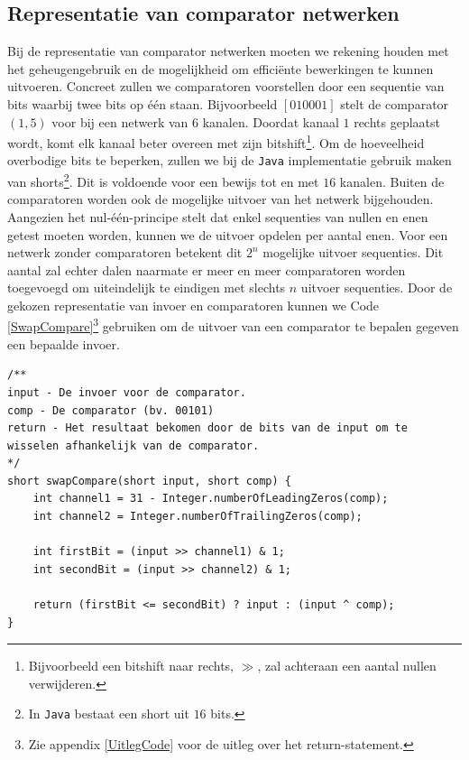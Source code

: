 \documentclass{article}
\begin{document}
\subsection{Representatie van comparator netwerken}\label{RepresentatieVanComparatorNetwerken}
Bij de representatie van comparator netwerken moeten we rekening houden met het geheugengebruik en de mogelijkheid om effici\"ente bewerkingen te kunnen uitvoeren.
Concreet zullen we comparatoren voorstellen door een sequentie van bits waarbij twee bits op \'e\'en staan.
Bijvoorbeeld  $ \left[ 0 1 0 0 0 1\right]$ stelt de comparator $\left(1,5\right)$ voor bij een netwerk van $6$ kanalen.
Doordat kanaal $1$ rechts geplaatst wordt, komt elk kanaal beter overeen met zijn bitshift\footnote{Bijvoorbeeld een bitshift naar rechts, $\gg$, zal achteraan een aantal nullen verwijderen.}.
Om de hoeveelheid overbodige bits te beperken, zullen we bij de \texttt{Java} implementatie gebruik maken van shorts\footnote{In \texttt{Java} bestaat een short uit $16$ bits.}.
Dit is voldoende voor een bewijs tot en met $16$ kanalen.
Buiten de comparatoren worden ook de mogelijke uitvoer van het netwerk bijgehouden.
Aangezien het nul-\'e\'en-principe stelt dat enkel sequenties van nullen en enen getest moeten worden, kunnen we de uitvoer opdelen per aantal enen.
Voor een netwerk zonder comparatoren betekent dit $2^n$ mogelijke uitvoer sequenties.
Dit aantal zal echter dalen naarmate er meer en meer comparatoren worden toegevoegd om uiteindelijk te eindigen met slechts $n$ uitvoer sequenties.
Door de gekozen representatie van invoer en comparatoren kunnen we Code \ref{SwapCompare}\footnote{Zie appendix \ref{UitlegCode} voor de uitleg over het return-statement.} gebruiken om de uitvoer van een comparator te bepalen gegeven een bepaalde invoer.
\begin{lstlisting}[caption={swapCompare},label=SwapCompare]
/**
input - De invoer voor de comparator.
comp - De comparator (bv. 00101)
return - Het resultaat bekomen door de bits van de input om te wisselen afhankelijk van de comparator.
*/
short swapCompare(short input, short comp) {
	int channel1 = 31 - Integer.numberOfLeadingZeros(comp);
	int channel2 = Integer.numberOfTrailingZeros(comp);
	
	int firstBit = (input >> channel1) & 1;
	int secondBit = (input >> channel2) & 1;
	
	return (firstBit <= secondBit) ? input : (input ^ comp);
}
\end{lstlisting}
\end{document}
